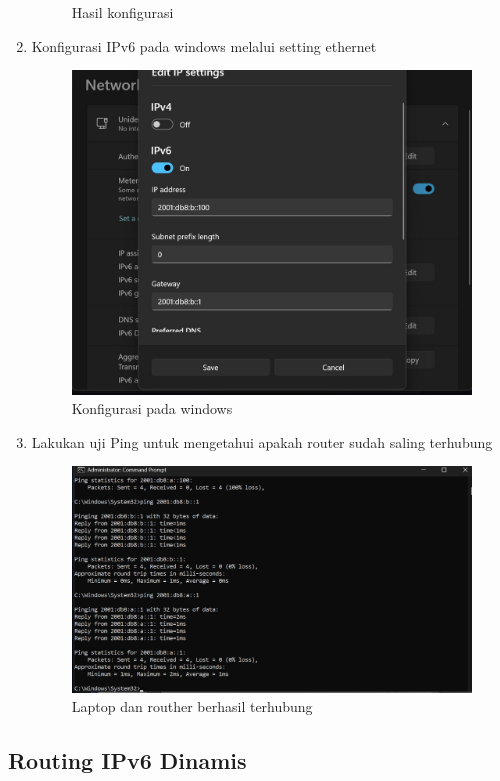 \begin{enumerate}
\begin{figure}[H]
    \caption{Hasil konfigurasi}
    \label{fig:inirujukan}
  \end{figure}
  \item Konfigurasi IPv6 pada windows melalui setting ethernet
   \begin{figure}[H]
    \centering
    \includegraphics[width=0.5\linewidth]{P1/img/10.jpeg}
    \caption{Konfigurasi pada windows}
    \label{fig:inirujukan}
  \end{figure}
  \item Lakukan uji Ping untuk mengetahui apakah router sudah saling terhubung
   \begin{figure}[H]
    \centering
    \includegraphics[width=0.5\linewidth]{P1/img/11.jpeg}
    \caption{Laptop dan routher berhasil terhubung}
    \label{fig:inirujukan}
  \end{figure}
\end{enumerate}

\subsection{Routing IPv6 Dinamis}

